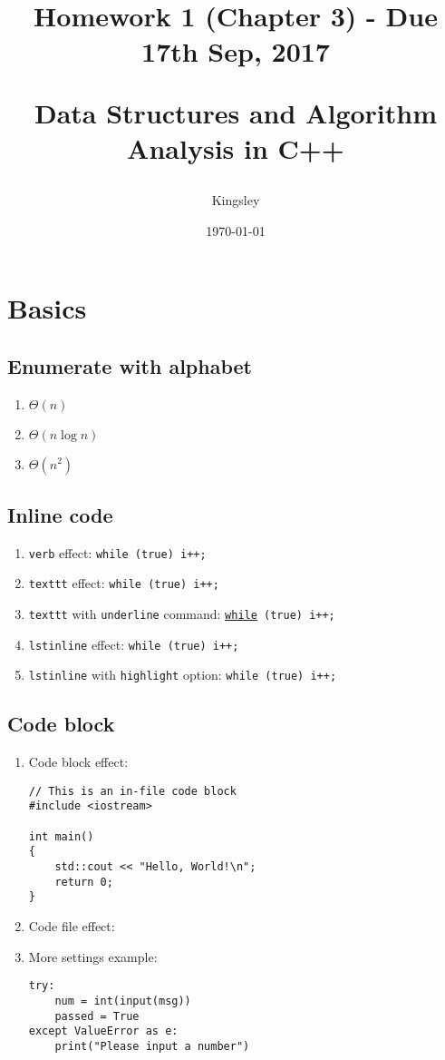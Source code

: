 \documentclass[titlepage]{article}
\title{
Homework 1 (Chapter 3) - Due 17th Sep, 2017\\
\begin{large}
Data Structures and Algorithm Analysis in C++
\end{large}
}
\author{Kingsley}
\date{\today}
\begin{document}
\maketitle

\hypersetup{pageanchor=false}
\clearpage
\tableofcontents
\clearpage
\hypersetup{pageanchor=true}

\section{Basics}
\subsection{Enumerate with alphabet}
\begin{enumerate}[label=(\alph*)]
\item $\Theta(n)$
\item $\Theta(n\log n)$
\item $\Theta(n^2)$
\end{enumerate}

\subsection{Inline code}
\begin{enumerate}
\item \verb|verb| effect: \verb|while (true) i++;|
\item \verb|texttt| effect: \texttt{while (true) i++;}
\item \verb|texttt| with \verb|underline| command: \texttt{\underline{while} (true) i++;}
\item \verb|lstinline| effect: \lstinline{while (true) i++;}
\item \verb|lstinline| with \verb|highlight| option: \lstinline[style=inline-hl]{while (true) i++;}
\end{enumerate}

\subsection{Code block}
\begin{enumerate}
\item Code block effect:
\begin{lstlisting}[style=display-code]
// This is an in-file code block
#include <iostream>

int main()
{
	std::cout << "Hello, World!\n";
	return 0;
}
\end{lstlisting}

\item Code file effect:


\item More settings example:
\begin{lstlisting}[style=more-settings]
try:
	num = int(input(msg))
	passed = True
except ValueError as e:
	print("Please input a number")
\end{lstlisting}
\end{enumerate}
\end{document}
